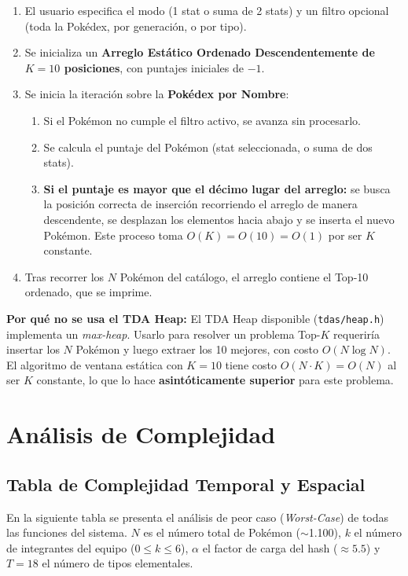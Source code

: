 \documentclass[12pt, letterpaper]{article}
\begin{document}
\begin{enumerate}
    \item El usuario especifica el modo (1 stat o suma de 2 stats) y un filtro opcional (toda la Pokédex, por generación, o por tipo).
    \item Se inicializa un \textbf{Arreglo Estático Ordenado Descendentemente de $K=10$ posiciones}, con puntajes iniciales de $-1$.
    \item Se inicia la iteración sobre la \textbf{Pokédex por Nombre}:
    \begin{enumerate}
        \item Si el Pokémon no cumple el filtro activo, se avanza sin procesarlo.
        \item Se calcula el puntaje del Pokémon (stat seleccionada, o suma de dos stats).
        \item \textbf{Si el puntaje es mayor que el décimo lugar del arreglo:} se busca la posición correcta de inserción recorriendo el arreglo de manera descendente, se desplazan los elementos hacia abajo y se inserta el nuevo Pokémon. Este proceso toma $O(K) = O(10) = O(1)$ por ser $K$ constante.
    \end{enumerate}
    \item Tras recorrer los $N$ Pokémon del catálogo, el arreglo contiene el Top-10 ordenado, que se imprime.
\end{enumerate}

\textbf{Por qué no se usa el TDA Heap:} El TDA Heap disponible (\texttt{tdas/heap.h}) implementa un \emph{max-heap}. Usarlo para resolver un problema Top-$K$ requeriría insertar los $N$ Pokémon y luego extraer los 10 mejores, con costo $O(N \log N)$. El algoritmo de ventana estática con $K=10$ tiene costo $O(N \cdot K) = O(N)$ al ser $K$ constante, lo que lo hace \textbf{asintóticamente superior} para este problema.

\section{Análisis de Complejidad}

\subsection{Tabla de Complejidad Temporal y Espacial}

En la siguiente tabla se presenta el análisis de peor caso (\emph{Worst-Case}) de todas las funciones del sistema. $N$ es el número total de Pokémon ($\sim$1.100), $k$ el número de integrantes del equipo ($0 \leq k \leq 6$), $\alpha$ el factor de carga del hash ($\approx 5.5$) y $T = 18$ el número de tipos elementales.
\end{document}
